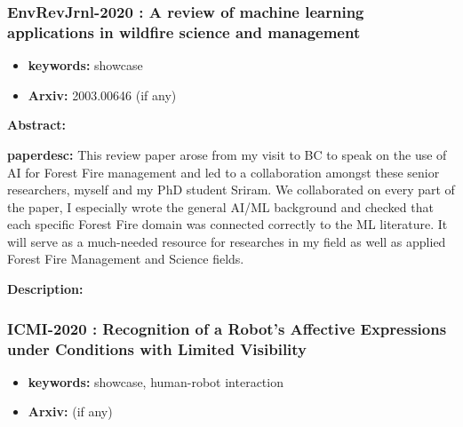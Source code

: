 \documentclass{article}
\begin{document}
\newpage
\subsubsection{\textbf{EnvRevJrnl-2020} : A review of machine learning applications in wildfire science and management}
\begin{itemize}
\item \textbf{keywords:} showcase
\item \textbf{Arxiv:} 2003.00646 (if any)
\end{itemize}


\textbf{Abstract:} 

\textbf{paperdesc:} This review paper arose from my visit to BC to speak on the use of AI for Forest Fire management and led to a collaboration amongst these senior researchers, myself and my PhD student Sriram. We collaborated on every part of the paper, I especially wrote the general AI/ML background and checked that each specific Forest Fire domain was connected correctly to the ML literature. It will serve as a much-needed resource for researches in my field as well as applied Forest Fire Management and Science fields.

\textbf{Description:} 



\newpage
\subsubsection{\textbf{ICMI-2020} : Recognition of a Robot's Affective Expressions under Conditions with Limited Visibility}
\begin{itemize}
\item \textbf{keywords:} showcase, human-robot interaction
\item \textbf{Arxiv:}  (if any)
\end{itemize}
\end{document}
